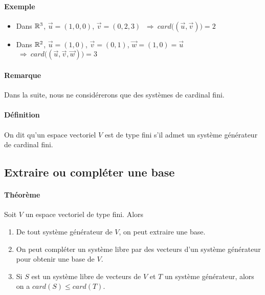 \paragraph{Exemple} 
\begin{itemize}
  \item Dans $\mathbb{R}^3$, $\vec{u} = (1, 0, 0)$, $\vec{v} = (0, 2, 3)$ $ ~ \Rightarrow ~ card\big((\vec{u}, \vec{v})\big) = 2$
  \item Dans $\mathbb{R}^2$, $\vec{u} = (1, 0)$, $\vec{v} = (0, 1)$, $\vec{w} = (1, 0) = \vec{u}$ $ ~ \Rightarrow ~ card\big((\vec{u}, \vec{v}, \vec{w})\big) = 3$
\end{itemize}

\paragraph{Remarque} Dans la suite, nous ne considérerons que des systèmes de cardinal fini.

\paragraph{Définition} On dit qu'un espace vectoriel $V$ est de type fini s'il admet un système générateur de cardinal fini.

%
\subsection{Extraire ou compléter une base}
%
\paragraph{Théorème} Soit $V$ un espace vectoriel de type fini. Alors
\begin{enumerate} 
  \item De tout système générateur de $V$, on peut extraire une base.
  \item On peut compléter un système libre par des vecteurs d'un système générateur pour obtenir une base de $V$.
  \item Si $S$ est un système libre de vecteurs de $V$ et $T$ un système générateur, alors on a $card(S) \leq card(T)$.
\end{enumerate}

